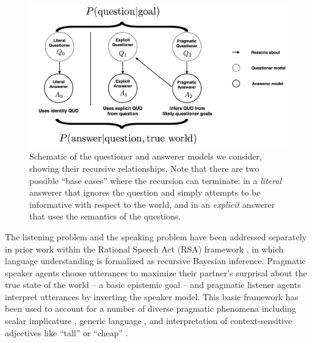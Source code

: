 \documentclass[12pt, floatsintext, jou]{apa6}
\begin{document}
\begin{figure}[t]
\begin{center}
\includegraphics[scale = .5]{models.png}
\end{center}
\caption{Schematic of the questioner and answerer models we consider, showing their recursive relationships. Note that there are two possible ``base cases'' where the recursion can terminate: in a \emph{literal} answerer that ignores the question and simply attempts to be informative with respect to the world, and in an \emph{explicit} answerer that uses the semantics of the questions.}
\label{fig:models}
\end{figure}

The listening problem and the speaking problem have been addressed separately in prior work within the Rational Speech Act (RSA) framework \cite{FrankGoodman12_PragmaticReasoningLanguageGames, GoodmanStuhlmuller13_KnowledgeImplicature, GoodmanFrank16_RSATiCS}, in which language understanding is formalized as recursive Bayesian inference. 
Pragmatic speaker agents choose utterances to maximize their partner's surprisal about the true state of the world -- a basic epistemic goal -- and pragmatic listener agents interpret utterances by inverting the speaker model. 
This basic framework has been used to account for a number of diverse pragmatic phenomena including 
scalar implicature \cite{GoodmanStuhlmuller13_KnowledgeImplicature}, %
generic language \cite{TesslerGoodman16_Generics}, and
interpretation of context-sensitive adjectives like ``tall'' or ``cheap'' \cite{LassiterGoodman15_AdjectivalVagueness}.
\end{document}
